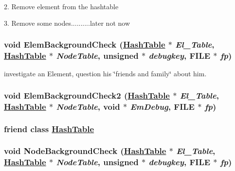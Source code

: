 2. Remove element from the hashtable

3. Remove some nodes..........later not now \hypertarget{classElement_n2}{
\subsubsection[ElemBackgroundCheck]{\setlength{\rightskip}{0pt plus 5cm}void Elem\-Background\-Check (\hyperlink{classHashTable}{Hash\-Table} $\ast$ {\em El\_\-Table}, \hyperlink{classHashTable}{Hash\-Table} $\ast$ {\em Node\-Table}, unsigned $\ast$ {\em debugkey}, FILE $\ast$ {\em fp})}}
\label{classElement_n2}


investigate an Element, question his \char`\"{}friends and family\char`\"{} about him. 

\hypertarget{classElement_n3}{
\subsubsection[ElemBackgroundCheck2]{\setlength{\rightskip}{0pt plus 5cm}void Elem\-Background\-Check2 (\hyperlink{classHashTable}{Hash\-Table} $\ast$ {\em El\_\-Table}, \hyperlink{classHashTable}{Hash\-Table} $\ast$ {\em Node\-Table}, void $\ast$ {\em Em\-Debug}, FILE $\ast$ {\em fp})}}
\label{classElement_n3}


\hypertarget{classElement_n0}{
\subsubsection[HashTable]{\setlength{\rightskip}{0pt plus 5cm}friend class \hyperlink{classHashTable}{Hash\-Table}}}
\label{classElement_n0}


\hypertarget{classElement_n4}{
\subsubsection[NodeBackgroundCheck]{\setlength{\rightskip}{0pt plus 5cm}void Node\-Background\-Check (\hyperlink{classHashTable}{Hash\-Table} $\ast$ {\em El\_\-Table}, \hyperlink{classHashTable}{Hash\-Table} $\ast$ {\em Node\-Table}, unsigned $\ast$ {\em debugkey}, FILE $\ast$ {\em fp})}}
\label{classElement_n4}



